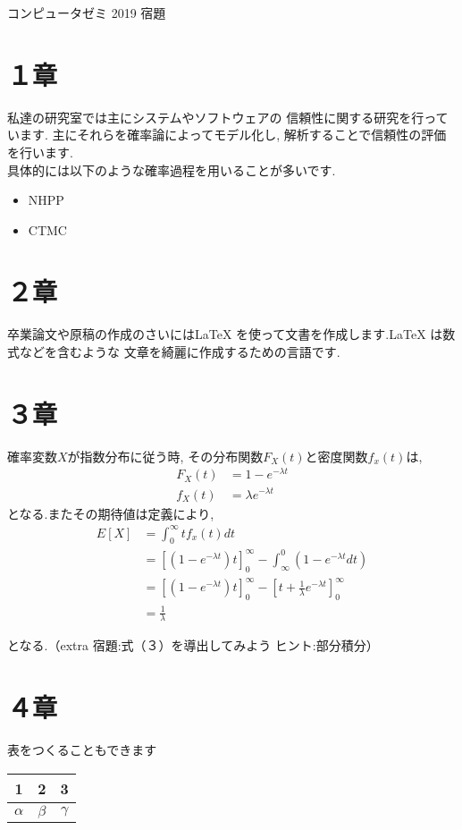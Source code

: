 \documentclass[a4paper,12pt]{article}
\begin{document}
\begin{center}
{\large }コンピュータゼミ 2019 宿題
\end{center}

\section{１章}
私達の研究室では主にシステムやソフトウェアの
信頼性に関する研究を行っています.
主にそれらを確率論によってモデル化し,
解析することで信頼性の評価を行います.\\
\quad
具体的には以下のような確率過程を用いることが多いです.
\begin{itemize}
\item NHPP
\item CTMC
\end{itemize}
\section{２章}
卒業論文や原稿の作成のさいには\LaTeX
を使って文書を作成します.\LaTeX
は数式などを含むような
文章を綺麗に作成するための言語です.
\section{３章}
確率変数$X$が指数分布に従う時,
その分布関数$F_X(t)$と密度関数$f_x(t)$は,
\begin{align}
F_X(t)  &=  1-e^{-\lambda t} \label{F_X} \\
f_X(t)  &=  \lambda e^{-\lambda t} \label{f_x}
\end{align}
となる.またその期待値は定義により,
\begin{align}
E[X] &= \int_{0}^{\infty} t f_x(t) dt\nonumber\\
&= [(1-e^{-\lambda t}) t]^\infty_0-\int_{\infty}^{0} (1-e^{-\lambda t} dt)\nonumber\\
&= [(1-e^{-\lambda t}) t]^\infty_0-[t + \frac{1}{\lambda}e^{-\lambda t}]^\infty_0\nonumber\\
&= \frac{1}{\lambda}
\end{align}

となる.（extra 宿題:式（３）を導出してみよう
ヒント:部分積分）
\section{４章}
表をつくることもできます
\begin{center}
\begin{tabular}{|c|c|c|}
\hline
 1 & 2 & 3 \\\hline
 $\alpha$ & $\beta$ & $\gamma$ \\\hline
\end{tabular}
\end{center}
\end{document}
